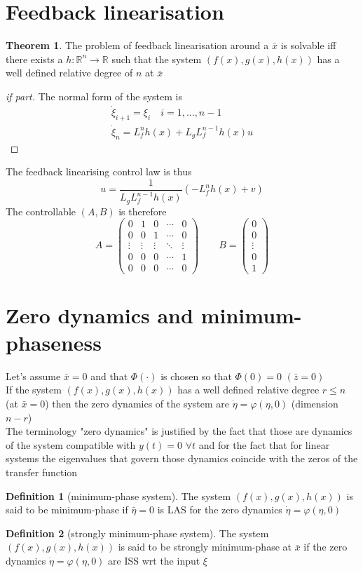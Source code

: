 \documentclass{book}
\newcommand{\R}{\mathbb{R}}
\theoremstyle{definition}
\newtheorem{definition}{Definition}[section]
\newtheorem{theorem}{Theorem}[section]
\theoremstyle{remark}
\theoremstyle{remark}
\begin{document}
\section{Feedback linearisation}
\begin{theorem}
    The problem of feedback linearisation around a $\bar{x}$ is solvable iff there exists a $h:\R^n\to\R$ such that the system $(f(x),g(x),h(x))$ has a well defined relative degree of $n$ at $\bar{x}$
\end{theorem}
\begin{proof}[if part]
    The normal form of the system is
    \begin{gather*}
        \dot{\xi}_{i+1}=\xi_i \quad i=1,\dots,n-1\\
        \dot{\xi}_n=L_f^nh(x)+L_gL_f^{n-1}h(x)u
    \end{gather*}
\end{proof}
The feedback linearising control law is thus
\[
    u=\frac{1}{L_gL_f^{n-1}h(x)}(-L_f^nh(x)+v)
\]
The controllable $(A,B)$ is therefore
\[
    A=\begin{pmatrix}
        0 & 1 & 0 & \cdots & 0\\
        0 & 0 & 1 & \cdots & 0\\
        \vdots & \vdots & \vdots & \ddots & \vdots\\
        0 & 0 & 0 & \cdots & 1\\
        0 & 0 & 0 & \cdots & 0
    \end{pmatrix} \qquad B=\begin{pmatrix}
        0 \\ 0 \\\vdots \\ 0 \\ 1
    \end{pmatrix}
\]

\section{Zero dynamics and minimum-phaseness}
Let's assume $\bar{x}=0$ and that $\Phi(\cdot)$ is chosen so that $\Phi(0)=0$ $(\bar{z}=0)$\\
If the system $(f(x),g(x),h(x))$ has a well defined relative degree $r\leq n $ (at $\bar{x}=0$) then the zero dynamics of the system are $\dot{\eta}=\varphi(\eta,0)$ (dimension $n-r$)\\
The terminology "zero dynamics" is justified by the fact that those are dynamics of the system compatible with $y(t)=0$  $\forall t$ and for the fact that for linear systems the eigenvalues that govern those dynamics coincide with the zeros of the transfer function

\begin{definition}[minimum-phase system]
    The system $(f(x),g(x),h(x))$ is said to be minimum-phase if $\bar{\eta}=0$ is LAS for the zero dynamics $\dot{\eta}=\varphi(\eta,0)$
\end{definition}
\begin{definition}[strongly minimum-phase system]
    The system $(f(x),g(x),h(x))$ is said to be strongly minimum-phase at $\bar{x}$ if the zero dynamics $\dot{\eta}=\varphi(\eta,0)$ are ISS wrt the input $\xi$
\end{definition}
\end{document}
